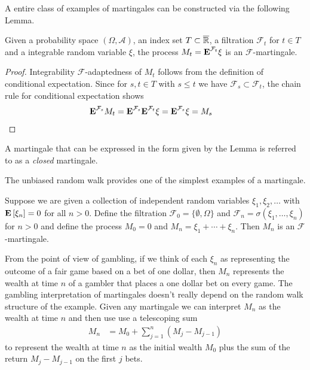 A entire class of examples of martingales can be constructed via the
following Lemma.  
\begin{lem}\label{ClosedMartingales}Given a probability space $(\Omega,  \mathcal{A})$, an
  index set $T \subset \overline{\mathbb{R}}$, a
  filtration $\mathcal{F}_t$ for $t \in T$ and a integrable random
  variable $\xi$, the process $M_t = \textbf{E}^{\mathcal{F}_t} \xi$ is
  an $\mathcal{F}$-martingale.
\end{lem}
\begin{proof}Integrability $\mathcal{F}$-adaptedness of $M_t$ follows from the definition of
  conditional expectation.  Since for $s,t \in T$ with $s \leq t$ we
  have $\mathcal{F}_s \subset \mathcal{F}_t$, the chain rule for
  conditional expectation shows 
\begin{align*}
\textbf{E}^{\mathcal{F}_s} M_t &=
\textbf{E}^{\mathcal{F}_s} \textbf{E}^{\mathcal{F}_t} \xi =
\textbf{E}^{\mathcal{F}_s} \xi = M_s
\end{align*}
\end{proof}
A martingale that can be expressed in the form given by the Lemma is
referred to as a \emph{closed} martingale.

The unbiased random walk provides one of the simplest examples of a martingale.
\begin{examp}\label{RandomWalkAsMartingale}Suppose we are given a collection of independent random
  variables $\xi_1, \xi_2, \dots$ with $\textbf{E}\left[\xi_n\right] = 0$ for
  all $n > 0$.  Define the filtration
  $\mathcal{F}_0 = \lbrace \emptyset, \Omega \rbrace$ and
  $\mathcal{F}_n = \sigma(\xi_1, \dots, \xi_n)$ for $n > 0$ and define
  the process $M_0=0$ and $M_n = \xi_1 + \cdots + \xi_n$.  Then $M_n$
  is an $\mathcal{F}$-martingale.
\end{examp}
From the point of view of gambling, if we think of each $\xi_n$ as
representing the outcome of a fair game based on a bet of one dollar,
then $M_n$ represents the wealth at time $n$ of a gambler that places a one dollar
bet on every game.  The gambling interpretation of martingales doesn't
really depend on the random walk structure of the example.  Given any
martingale we can interpret $M_n$ as the wealth at time $n$ and then
use use a telescoping sum
\begin{align*}
M_n &= M_0 + \sum_{j=1}^n (M_j - M_{j-1})
\end{align*}
to represent the wealth at time $n$ as the initial wealth $M_0$ plus
the sum of the return $M_j - M_{j-1}$ on the first $j$ bets.

